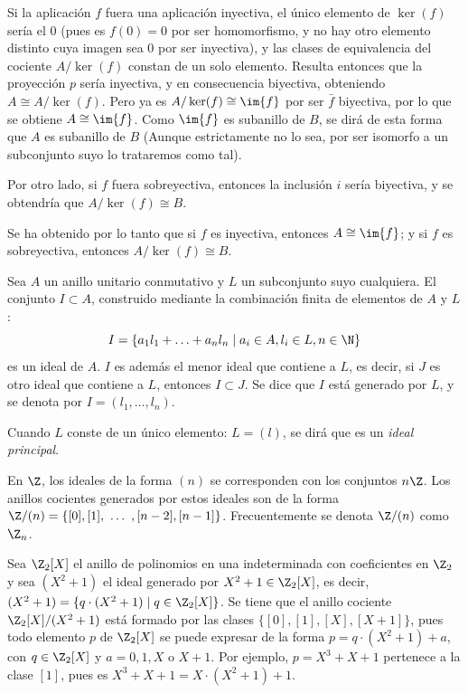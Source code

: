 \begin{obss}
    \item Si la aplicación $f$ fuera una aplicación inyectiva, el único elemento de $\ker (f)$ sería el $0$ (pues es $f(0) = 0$ por ser homomorfismo, y no hay otro elemento distinto cuya imagen sea $0$ por ser inyectiva), y las clases de equivalencia del cociente $A/\ker(f)$ constan de un solo elemento. Resulta entonces que la proyección $p$ sería inyectiva, y en consecuencia biyectiva, obteniendo $A\cong A/\ker(f)$. Pero ya es $A/\ker(f) \cong \im{f}$ por ser $\bar f$ biyectiva, por lo que se obtiene $A\cong \im{f}$. Como $\im{f}$ es subanillo de $B$, se dirá de esta forma que $A$ es subanillo de $B$ (Aunque estrictamente no lo sea, por ser isomorfo a un subconjunto suyo lo trataremos como tal). 
    \item Por otro lado, si $f$ fuera sobreyectiva, entonces la inclusión $i$ sería biyectiva, y se obtendría que $A/\ker (f) \cong B$. 
     
    Se ha obtenido por lo tanto que si $f$ es inyectiva, entonces $A\cong \im{f}$; y si $f$ es sobreyectiva, entonces $A/\ker (f) \cong B$.
    
\end{obss}

\begin{deff}{\cite[p.~27]{GamboaAnillos}}
    Sea $A$ un anillo unitario conmutativo y $L$ un subconjunto suyo cualquiera. El conjunto $I \subset A$, construido mediante la combinación finita de elementos de $A$ y $L$: 
    \[
        I = \{a_1l_1 + \ldots + a_nl_n\mid a_i\in A, l_i \in L, n\in\N\}
    \]
    es un ideal de $A$. $I$ es además el menor ideal que contiene a $L$, es decir, si $J$ es otro ideal que contiene a $L$, entonces $I \subset J$. Se dice que $I$ está generado por $L$, y se denota por $ I = (l_1, \ldots, l_n)$.
    \item Cuando $L$ conste de un único elemento: $L =(l)$, se dirá que es un \textit{ideal principal}.
\end{deff}

\begin{ejs}\label{ej:idealGenerado}
    \item En $\Z$, los ideales de la forma $(n)$ se corresponden con los conjuntos $n\Z$. Los anillos cocientes generados por estos ideales son de la forma $\Z/(n) = \{[0],[1], \ \ldots \ , [n-2], [n-1]\}$. Frecuentemente se denota $\Z/(n)$ como $\Z_n$.
    
    \item 
    
        Sea $\Z_2[X]$ el anillo de polinomios en una indeterminada con coeficientes en $\Z_2$ y sea $(X^2+1)$ el ideal generado por $X^2+1\in \Z_2[X]$, es decir, $(X^2+1) = \{q\cdot(X^2+1) \mid q\in \Z_2[X]\}$. Se tiene que el anillo cociente $\Z_2[X]/(X^2+1)$ está formado por las clases $\{[0],[1],[X],[X+1]\}$, pues todo elemento $p$ de $\Z_2[X]$ se puede expresar de la forma $p = q\cdot(X^2+1) + a$, con $q\in \Z_2[X]$ y $a = 0,1,X \text{ o } X+1$. Por ejemplo, $p = X^3 + X + 1$ pertenece a la clase $[1]$, pues es $X^3 + X + 1 = X\cdot (X^2+1) + 1$.
    
\end{ejs}


